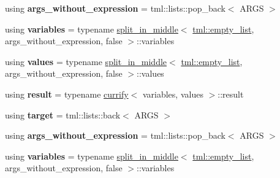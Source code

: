 \begin{DoxyCompactItemize}
\item 
\hypertarget{structtml_1_1impl_1_1multi__let__currifier_ae30bf2ee476c981d43bc0187bf42b357}{using {\bfseries args\+\_\+without\+\_\+expression} = tml\+::lists\+::pop\+\_\+back$<$ A\+R\+G\+S $>$}\label{structtml_1_1impl_1_1multi__let__currifier_ae30bf2ee476c981d43bc0187bf42b357}

\item 
\hypertarget{structtml_1_1impl_1_1multi__let__currifier_ad331ebe4d1265c453e0da97605e19d27}{using {\bfseries variables} = typename \hyperlink{structtml_1_1impl_1_1multi__let__currifier_1_1split__in__middle}{split\+\_\+in\+\_\+middle}$<$ \hyperlink{structtml_1_1list}{tml\+::empty\+\_\+list}, args\+\_\+without\+\_\+expression, false $>$\+::variables}\label{structtml_1_1impl_1_1multi__let__currifier_ad331ebe4d1265c453e0da97605e19d27}

\item 
\hypertarget{structtml_1_1impl_1_1multi__let__currifier_a704710d5d8e1d144821bb56b2025eab8}{using {\bfseries values} = typename \hyperlink{structtml_1_1impl_1_1multi__let__currifier_1_1split__in__middle}{split\+\_\+in\+\_\+middle}$<$ \hyperlink{structtml_1_1list}{tml\+::empty\+\_\+list}, args\+\_\+without\+\_\+expression, false $>$\+::values}\label{structtml_1_1impl_1_1multi__let__currifier_a704710d5d8e1d144821bb56b2025eab8}

\item 
\hypertarget{structtml_1_1impl_1_1multi__let__currifier_aea293d4760e8c0d547d2459c9148dc98}{using {\bfseries result} = typename \hyperlink{structtml_1_1impl_1_1multi__let__currifier_1_1currify}{currify}$<$ variables, values $>$\+::result}\label{structtml_1_1impl_1_1multi__let__currifier_aea293d4760e8c0d547d2459c9148dc98}

\item 
\hypertarget{structtml_1_1impl_1_1multi__let__currifier_ab422a7d96048a577cc246d0be421db36}{using {\bfseries target} = tml\+::lists\+::back$<$ A\+R\+G\+S $>$}\label{structtml_1_1impl_1_1multi__let__currifier_ab422a7d96048a577cc246d0be421db36}

\item 
\hypertarget{structtml_1_1impl_1_1multi__let__currifier_ae30bf2ee476c981d43bc0187bf42b357}{using {\bfseries args\+\_\+without\+\_\+expression} = tml\+::lists\+::pop\+\_\+back$<$ A\+R\+G\+S $>$}\label{structtml_1_1impl_1_1multi__let__currifier_ae30bf2ee476c981d43bc0187bf42b357}

\item 
\hypertarget{structtml_1_1impl_1_1multi__let__currifier_ad331ebe4d1265c453e0da97605e19d27}{using {\bfseries variables} = typename \hyperlink{structtml_1_1impl_1_1multi__let__currifier_1_1split__in__middle}{split\+\_\+in\+\_\+middle}$<$ \hyperlink{structtml_1_1list}{tml\+::empty\+\_\+list}, args\+\_\+without\+\_\+expression, false $>$\+::variables}\label{structtml_1_1impl_1_1multi__let__currifier_ad331ebe4d1265c453e0da97605e19d27}


\end{DoxyCompactItemize}
